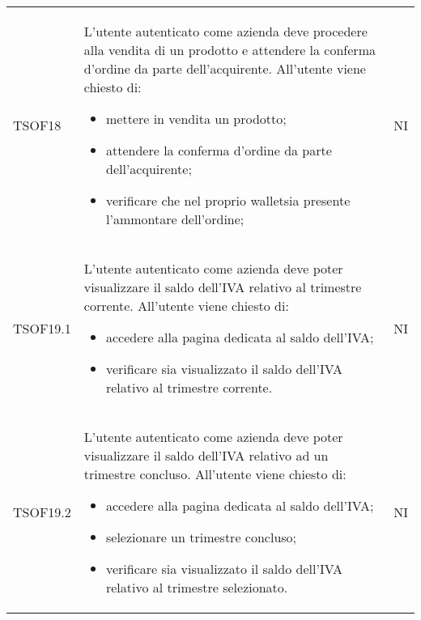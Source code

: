 \begin{longtable}{ >{\centering}p{} >{\centering}p{}
			>{\centering}p{}}
		TSOF18	&	L'utente autenticato come azienda deve procedere alla vendita di un prodotto e attendere la conferma d'ordine da parte dell'acquirente. All'utente viene chiesto di:
		\begin{itemize}
			\item mettere in vendita un prodotto;
			\item attendere la conferma d'ordine da parte dell'acquirente;
			\item verificare che nel proprio wallet\glosp sia presente l'ammontare dell'ordine;
		\end{itemize}	&	NI	
	
	    \tabularnewline
		TSOF19.1	&	L'utente autenticato come azienda deve poter visualizzare il saldo dell'IVA
		relativo al trimestre corrente. All'utente viene chiesto di:
		\begin{itemize}
			\item accedere alla pagina dedicata al saldo dell'IVA;
			\item verificare sia visualizzato il saldo dell'IVA relativo al trimestre
			corrente.
		\end{itemize}	&	NI
		\tabularnewline
		
		TSOF19.2	&	L'utente autenticato come azienda deve poter visualizzare il saldo dell'IVA
		relativo ad un trimestre concluso. All'utente viene chiesto di:
		\begin{itemize}
			\item accedere alla pagina dedicata al saldo dell'IVA;
			\item selezionare un trimestre concluso;
			\item verificare sia visualizzato il saldo dell'IVA relativo al trimestre
			selezionato.
		\end{itemize}	&	NI	
	\tabularnewline
	

\end{longtable}
